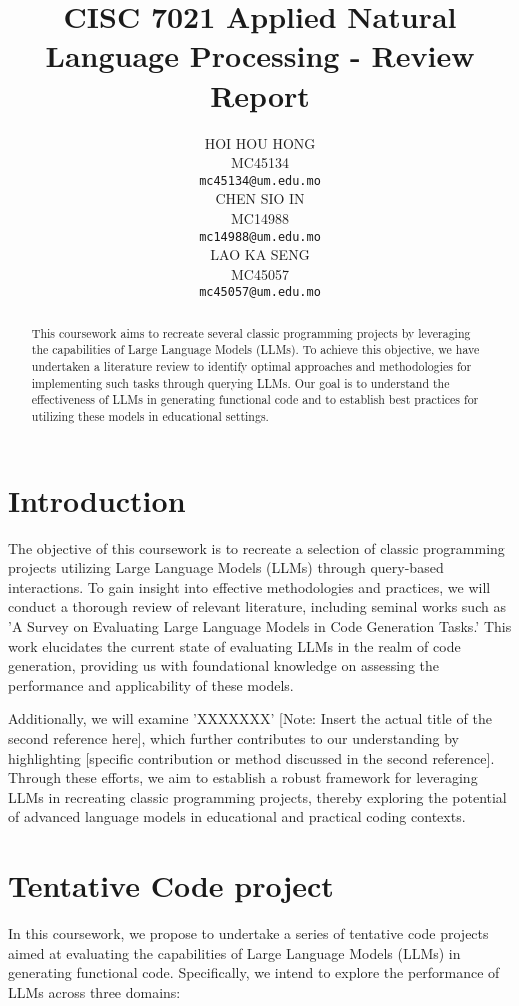 \documentclass[11pt]{article}
\title{CISC 7021 Applied Natural Language Processing - Review Report}
\author{HOI HOU HONG \\
  MC45134 \\
  \texttt{mc45134@um.edu.mo} \\\And
  CHEN SIO IN \\
  MC14988\\
  \texttt{mc14988@um.edu.mo} \\\And
  LAO KA SENG \\
  MC45057 \\
  \texttt{mc45057@um.edu.mo} \\}
\begin{document}
\maketitle
\begin{abstract}
This coursework aims to recreate several classic programming projects by leveraging the capabilities of Large Language Models (LLMs). To achieve this objective, we have undertaken a literature review to identify optimal approaches and methodologies for implementing such tasks through querying LLMs. Our goal is to understand the effectiveness of LLMs in generating functional code and to establish best practices for utilizing these models in educational settings.
\end{abstract}

\section{Introduction}

The objective of this coursework is to recreate a selection of classic programming projects utilizing Large Language Models (LLMs) through query-based interactions. To gain insight into effective methodologies and practices, we will conduct a thorough review of relevant literature, including seminal works such as 'A Survey on Evaluating Large Language Models in Code Generation Tasks.'\cite{chen2024survey} This work elucidates the current state of evaluating LLMs in the realm of code generation, providing us with foundational knowledge on assessing the performance and applicability of these models. 


Additionally, we will examine 'XXXXXXX' [Note: Insert the actual title of the second reference here], which further contributes to our understanding by highlighting [specific contribution or method discussed in the second reference]. Through these efforts, we aim to establish a robust framework for leveraging LLMs in recreating classic programming projects, thereby exploring the potential of advanced language models in educational and practical coding contexts.

\section{Tentative Code project}
In this coursework, we propose to undertake a series of tentative code projects aimed at evaluating the capabilities of Large Language Models (LLMs) in generating functional code. Specifically, we intend to explore the performance of LLMs across three domains: 
\end{document}
